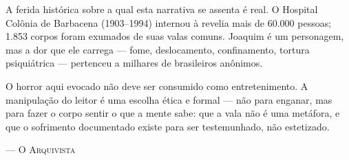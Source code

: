 \vspace{1.2em}

\vspace{1.2em}
\noindent A ferida histórica sobre a qual esta narrativa se assenta é real. O Hospital Colônia de Barbacena (1903--1994)  internou à revelia mais de 60.000 pessoas; 1.853 corpos foram exumados de suas valas comuns. Joaquim é um personagem, mas a dor que ele carrega --- fome, deslocamento, confinamento, tortura psiquiátrica --- pertenceu a milhares de brasileiros anônimos.

\vspace{0.6em}
\noindent O horror aqui evocado não deve ser consumido como entretenimento. A manipulação do leitor é uma escolha ética e formal --- não para enganar, mas para fazer o corpo sentir o que a mente sabe: que a vala não é uma metáfora, e que o sofrimento documentado existe para ser testemunhado, não estetizado.

\vspace{0.6em}

\vspace{1.4em}
\hfill{\scshape --- O Arquivista}\hspace{1em}

\endgroup
\clearpage
